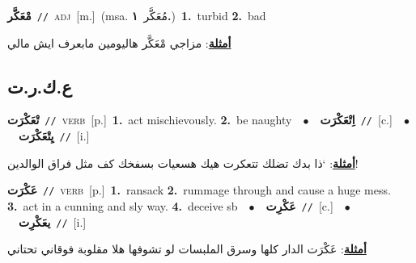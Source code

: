 \documentclass[10pt,a4paper,twoside]{article} %
\begin{document}
\begin{multicols}{2}
{\setlength\topsep{0pt}\textbf{\foreignlanguage{arabic}{مْعَكَّر}}\ {\color{gray}\texttt{//}\color{black}}\ \textsc{adj}\ [m.]\ \color{gray}(msa. \foreignlanguage{arabic}{مُعَكَّر}~\foreignlanguage{arabic}{\textbf{١.}})\color{black}\ \textbf{1.}~turbid  \textbf{2.}~bad\  \begin{flushright}\color{gray}\foreignlanguage{arabic}{\textbf{\underline{\foreignlanguage{arabic}{أمثلة}}}: مزاجي مْعَكَّر هاليومين مابعرف ايش مالي}\end{flushright}\color{black}} \vspace{2mm}

\vspace{-3mm}
\subsection*{\color{blue}\foreignlanguage{arabic}{ع.ك.ر.ت}\color{blue}{}} 

{\setlength\topsep{0pt}\textbf{\foreignlanguage{arabic}{تْعَكْرَت}}\ {\color{gray}\texttt{//}\color{black}}\ \textsc{verb}\ [p.]\ \textbf{1.}~act mischievously.  \textbf{2.}~be naughty\ \ $\bullet$\ \ \setlength\topsep{0pt}\textbf{\foreignlanguage{arabic}{اِتْعَكْرَت}}\ {\color{gray}\texttt{//}\color{black}}\ [c.]\ \ $\bullet$\ \ \setlength\topsep{0pt}\textbf{\foreignlanguage{arabic}{يِتْعَكْرَت}}\ {\color{gray}\texttt{//}\color{black}}\ [i.]\  \begin{flushright}\color{gray}\foreignlanguage{arabic}{\textbf{\underline{\foreignlanguage{arabic}{أمثلة}}}: ‘ذا بدك تضلك تتعكرت هيك هسعيات بسفخك كف مثل فراق الوالدين!}\end{flushright}\color{black}} \vspace{2mm}

{\setlength\topsep{0pt}\textbf{\foreignlanguage{arabic}{عَكْرَت}}\ {\color{gray}\texttt{//}\color{black}}\ \textsc{verb}\ [p.]\ \textbf{1.}~ransack  \textbf{2.}~rummage through and cause a huge mess.  \textbf{3.}~act in a cunning and sly way.  \textbf{4.}~deceive sb\ \ $\bullet$\ \ \setlength\topsep{0pt}\textbf{\foreignlanguage{arabic}{عَكْرِت}}\ {\color{gray}\texttt{//}\color{black}}\ [c.]\ \ $\bullet$\ \ \setlength\topsep{0pt}\textbf{\foreignlanguage{arabic}{يعَكْرِت}}\ {\color{gray}\texttt{//}\color{black}}\ [i.]\  \begin{flushright}\color{gray}\foreignlanguage{arabic}{\textbf{\underline{\foreignlanguage{arabic}{أمثلة}}}: عَكْرَت الدار كلها وسرق الملبسات لو تشوفها هلا مقلوبة فوقاني تحتاني}\end{flushright}\color{black}} \vspace{2mm}


\end{multicols}
\end{document}
